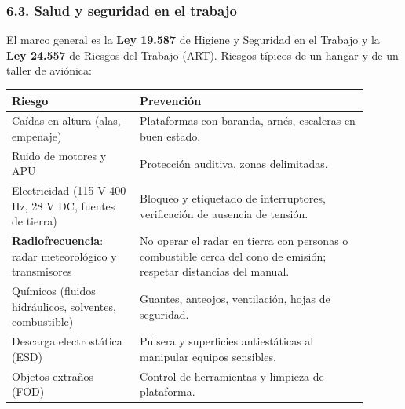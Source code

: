 \subsubsection*{6.3. Salud y seguridad en el trabajo}
El marco general es la \textbf{Ley 19.587} de Higiene y Seguridad en el Trabajo y la \textbf{Ley
24.557} de Riesgos del Trabajo (ART). Riesgos típicos de un hangar y de un taller de aviónica:
\begin{center}
\small
\begin{tabular}{|p{0.32\linewidth}|p{0.58\linewidth}|}
\hline
\textbf{Riesgo} & \textbf{Prevención} \\ \hline
Caídas en altura (alas, empenaje) & Plataformas con baranda, arnés, escaleras en buen estado. \\
\hline
Ruido de motores y APU & Protección auditiva, zonas delimitadas. \\ \hline
Electricidad (115 V 400 Hz, 28 V DC, fuentes de tierra) & Bloqueo y etiquetado de
interruptores, verificación de ausencia de tensión. \\ \hline
\textbf{Radiofrecuencia}: radar meteorológico y transmisores & No operar el radar en tierra con
personas o combustible cerca del cono de emisión; respetar distancias del manual. \\ \hline
Químicos (fluidos hidráulicos, solventes, combustible) & Guantes, anteojos, ventilación, hojas de
seguridad. \\ \hline
Descarga electrostática (ESD) & Pulsera y superficies antiestáticas al manipular equipos
sensibles. \\ \hline
Objetos extraños (FOD) & Control de herramientas y limpieza de plataforma. \\ \hline
\end{tabular}
\end{center}

